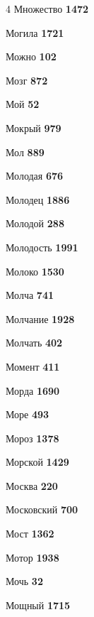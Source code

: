 \begin{multicols}{4}
\noindent Множество \dotfill \textbf{\color{secondary} 1472}\par
\noindent Могила \dotfill \textbf{\color{secondary} 1721}\par
\noindent Можно \dotfill \textbf{\color{secondary} 102}\par
\noindent Мозг \dotfill \textbf{\color{secondary} 872}\par
\noindent Мой \dotfill \textbf{\color{secondary} 52}\par
\noindent Мокрый \dotfill \textbf{\color{secondary} 979}\par
\noindent Мол \dotfill \textbf{\color{secondary} 889}\par
\noindent Молодая \dotfill \textbf{\color{secondary} 676}\par
\noindent Молодец \dotfill \textbf{\color{secondary} 1886}\par
\noindent Молодой \dotfill \textbf{\color{secondary} 288}\par
\noindent Молодость \dotfill \textbf{\color{secondary} 1991}\par
\noindent Молоко \dotfill \textbf{\color{secondary} 1530}\par
\noindent Молча \dotfill \textbf{\color{secondary} 741}\par
\noindent Молчание \dotfill \textbf{\color{secondary} 1928}\par
\noindent Молчать \dotfill \textbf{\color{secondary} 402}\par
\noindent Момент \dotfill \textbf{\color{secondary} 411}\par
\noindent Морда \dotfill \textbf{\color{secondary} 1690}\par
\noindent Море \dotfill \textbf{\color{secondary} 493}\par
\noindent Мороз \dotfill \textbf{\color{secondary} 1378}\par
\noindent Морской \dotfill \textbf{\color{secondary} 1429}\par
\noindent Москва \dotfill \textbf{\color{secondary} 220}\par
\noindent Московский \dotfill \textbf{\color{secondary} 700}\par
\noindent Мост \dotfill \textbf{\color{secondary} 1362}\par
\noindent Мотор \dotfill \textbf{\color{secondary} 1938}\par
\noindent Мочь \dotfill \textbf{\color{secondary} 32}\par
\noindent Мощный \dotfill \textbf{\color{secondary} 1715}\par

\end{multicols}
